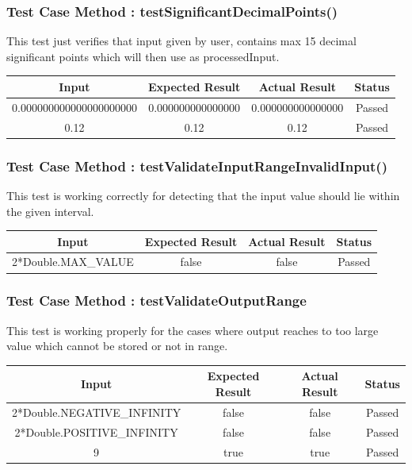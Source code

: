 \documentclass[a4paper,11pt]{report}
\begin{document}
\subsubsection{Test Case Method : testSignificantDecimalPoints() }
This test just verifies that input given by user, contains max 15 decimal significant points which will then use as processedInput.
\begin{center}
\begin{tabular}{ |c|c|c|c| } 
\hline
\textbf{Input} & \textbf{Expected Result} & \textbf{Actual Result} & \textbf{Status} \\
\hline
0.000000000000000000000 & 0.000000000000000 & 0.000000000000000 & Passed \\ 
\hline
0.12 & 0.12 & 0.12 & Passed \\ 
\hline
\end{tabular}
\end{center}
\subsubsection{Test Case Method : testValidateInputRangeInvalidInput() }
This test is working correctly for detecting that the input value should lie within the given interval.
\begin{center}
\begin{tabular}{ |c|c|c|c| } 
\hline
\textbf{Input} & \textbf{Expected Result} & \textbf{Actual Result} & \textbf{Status} \\
\hline
2*Double.MAX\_VALUE & false & false & Passed \\ 
\hline
\end{tabular}
\end{center}
\subsubsection{Test Case Method : testValidateOutputRange }
This test is working properly for the cases where output reaches to too large value which cannot be stored or not in range.
\begin{center}
\begin{tabular}{ |c|c|c|c| } 
\hline
\textbf{Input} & \textbf{Expected Result} & \textbf{Actual Result} & \textbf{Status} \\
\hline
2*Double.NEGATIVE\_INFINITY & false & false & Passed \\ 
\hline
2*Double.POSITIVE\_INFINITY & false & false & Passed \\ 
\hline
9 & true & true & Passed\\
\hline
\end{tabular}
\end{center}
\end{document}
